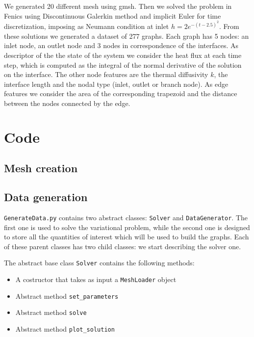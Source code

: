 \documentclass[11pt,a4paper]{article}
\begin{document}
We generated 20 different mesh using gmsh. 
Then we solved the problem in Fenics using Discontinuous Galerkin method and implicit
Euler for time discretization, imposing as Neumann condition at inlet 
\(h = 2e^{-(t-2.5)^2}\).
From these solutions we generated a dataset of 277 graphs. Each graph has 5 nodes: 
an inlet node, an outlet node and 3 nodes in correspondence of the interfaces. As 
descriptor of the the state of the system we consider the heat flux at each time step,
which is computed as the integral of the normal derivative of the solution on the interface.
The other node features are the thermal diffusivity \(k\), the interface length and the 
nodal type (inlet, outlet or branch node). As edge features we consider the area of the
corresponding trapezoid and the distance between the nodes connected by the edge. 




\section{Code}


\subsection{Mesh creation}

\subsection{Data generation}

\texttt{GenerateData.py} contains two abstract classes: \texttt{Solver} and 
\texttt{DataGenerator}. The first one is used to solve the variational problem, while 
the second one is designed to store all the quantities of interest which
will be used to build the graphs. Each of these parent classes has two child classes:
we start describing the solver one. 

The abstract base class \texttt{Solver} contains the following methods:
\begin{itemize}
    \item A costructor that takes as input a \texttt{MeshLoader} object 
    \item Abstract method \texttt{set\_parameters}
    \item Abstract method \texttt{solve}
    \item Abstract method \texttt{plot\_solution}
\end{itemize}
\end{document}
